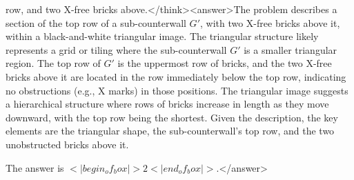 row, and two X-free bricks above.</think><answer>The problem describes a section of the top row of a sub-counterwall \( G' \), with two X-free bricks above it, within a black-and-white triangular image. The triangular structure likely represents a grid or tiling where the sub-counterwall \( G' \) is a smaller triangular region. The top row of \( G' \) is the uppermost row of bricks, and the two X-free bricks above it are located in the row immediately below the top row, indicating no obstructions (e.g., X marks) in those positions. The triangular image suggests a hierarchical structure where rows of bricks increase in length as they move downward, with the top row being the shortest. Given the description, the key elements are the triangular shape, the sub-counterwall's top row, and the two unobstructed bricks above it.  

The answer is \(<|begin_of_box|>2<|end_of_box|>\).</answer>
